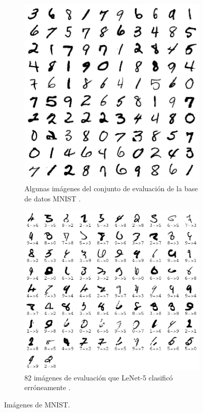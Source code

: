 \begin{figure}[h]
    \centering
    \begin{subfigure}[b]{0.4\textwidth}
        \centering
        \includegraphics[width=\textwidth]{images/MNIST.png}
        \caption{Algunas imágenes del conjunto de evaluación de la base de datos MNIST \cite{Lecun98}.}
        \label{mnist1}
    \end{subfigure}
    \hspace{1cm}
    \begin{subfigure}[b]{0.45\textwidth}
        \centering
        \includegraphics[width=\textwidth]{images/MNISTmiscl.png}
        \caption{82 imágenes de evaluación que LeNet-5 clasificó erróneamente \cite{Lecun98}.}
        \label{mnist2}
    \end{subfigure}
    \caption{Imágenes de MNIST.}
    \label{mnist}
\end{figure}

